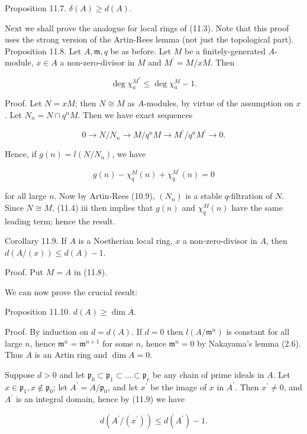 \documentclass{standalone}
\theoremstyle{definition}
\theoremstyle{remark}
\begin{document}
Proposition 11.7. $\delta(A) \geqslant d(A)$.

Next we shall prove the analogue for local rings of (11.3). Note that this proof uses the strong version of the Artin-Rees lemma (not just the topological part). Proposition 11.8. Let $A, \mathfrak{m}, q$ be as before. Let $M$ be a finitely-generated $A$-module, $x \in A$ a non-zero-divisor in $M$ and $M^{\prime}=M / x M$. Then

\[
\operatorname{deg} \chi_{a}^{M^{*}} \leqslant \operatorname{deg} \chi_{a}^{M}-1 .
\]

Proof. Let $N=x M$; then $N \cong M$ as $A$-modules, by virtue of the assumption on $x$. Let $N_{n}=N \cap q^{n} M$. Then we have exact sequences

\[
0 \rightarrow N / N_{n} \rightarrow M / q^{n} M \rightarrow M^{\prime} / q^{n} M^{\prime} \rightarrow 0 .
\]

Hence, if $g(n)=l\left(N / N_{n}\right)$, we have

\[
g(n)-\chi_{q}^{M}(n)+\chi_{q}^{M^{\prime}}(n)=0
\]

for all large $n$. Now by Artin-Rees (10.9), $\left(N_{n}\right)$ is a stable $q$-filtration of $N$. Since $N \cong M$, (11.4) iii then implies that $g(n)$ and $\chi_{q}^{M}(n)$ have the same leading term; hence the result.

Corollary 11.9. If $A$ is a Noetherian local ring, $x$ a non-zero-divisor in $A$, then $d(A /(x)) \leqslant d(A)-1$.

Proof. Put $M=A$ in (11.8).

We can now prove the crucial result:

Proposition 11.10. $d(A) \geqslant \operatorname{dim} A$.

Proof. By induction on $d=d(A)$. If $d=0$ then $l\left(A / \mathfrak{m}^{n}\right)$ is constant for all large $n$, hence $\mathfrak{m}^{n}=\mathfrak{m}^{n+1}$ for some $n$, hence $\mathfrak{m}^{n}=0$ by Nakayama's lemma (2.6). Thus $A$ is an Artin ring and $\operatorname{dim} A=0$.

Suppose $d>0$ and let $\mathfrak{p}_{0} \subset \mathfrak{p}_{1} \subset \ldots \subset \mathfrak{p}_{r}$ be any chain of prime ideals in $A$. Let $x \in \mathfrak{p}_{1}, x \notin \mathfrak{p}_{0}$; let $A^{\prime}=A / \mathfrak{p}_{0}$, and let $x^{\prime}$ be the image of $x$ in $A^{\prime}$. Then $x^{\prime} \neq 0$, and $A^{\prime}$ is an integral domain, hence by (11.9) we have

\[
d\left(A^{\prime} /\left(x^{\prime}\right)\right) \leqslant d\left(A^{\prime}\right)-1 .
\]
\end{document}
